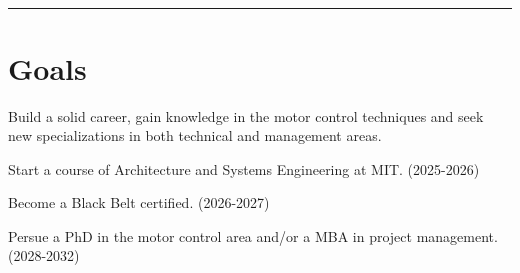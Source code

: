 \documentclass[10pt]{article}
\begin{document}


\section{}
%
%
%
\newlength{\rcollength}\setlength{\rcollength}{2.55in}%
%
\\
\\
\blankline
\hrule
%

\section{Goals}
\begin{outerlist}
\vspace{-0.65cm}
       	  \item[] Build a solid career, gain knowledge in the motor control techniques and seek new specializations in both technical and management areas.
          \item[] Start a course of Architecture and Systems Engineering at MIT. (2025-2026)
          \item[] Become a Black Belt certified. (2026-2027)
          \item[] Persue a PhD in the motor control area and/or a MBA in project management. (2028-2032)
\end{outerlist}
\end{document}
